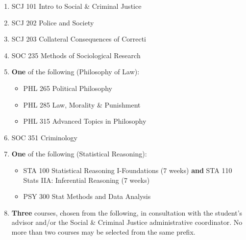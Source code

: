 \documentclass[
  letterpaper,
]{scrbook}
\providecommand{\tightlist}{%
  \setlength{\itemsep}{0pt}\setlength{\parskip}{0pt}}
\begin{document}
\begin{enumerate}
\def\labelenumi{\arabic{enumi}.}
\tightlist
\item
  SCJ 101 Intro to Social \& Criminal Justice\\
\item
  SCJ 202 Police and Society\\
\item
  SCJ 203 Collateral Consequences of Correcti\\
\item
  SOC 235 Methods of Sociological Research\\
\item
  \textbf{One} of the following (Philosophy of Law):

  \begin{itemize}
  \tightlist
  \item
    PHL 265 Political Philosophy\\
  \item
    PHL 285 Law, Morality \& Punishment\\
  \item
    PHL 315 Advanced Topics in Philosophy\\
  \end{itemize}
\item
  SOC 351 Criminology\\
\item
  \textbf{One} of the following (Statistical Reasoning):

  \begin{itemize}
  \tightlist
  \item
    STA 100 Statistical Reasoning I-Foundations (7 weeks) \textbf{and}
    STA 110 Stats IIA: Inferential Reasoning (7 weeks)\\
  \item
    PSY 300 Stat Methods and Data Analysis\\
  \end{itemize}
\item
  \textbf{Three} courses, chosen from the following, in consultation
  with the student's advisor and/or the Social \& Criminal Justice
  administrative coordinator. No more than two courses may be selected
  from the same prefix.


\end{enumerate}
\end{document}
